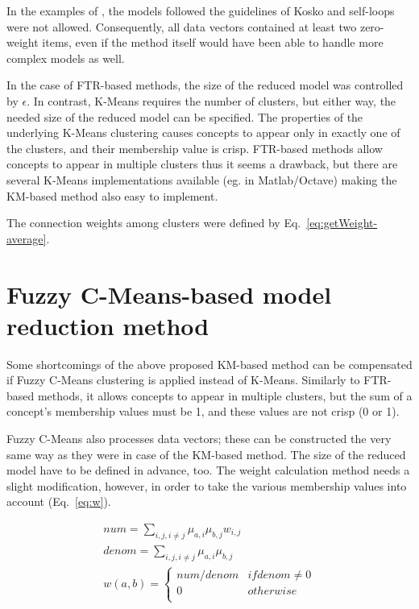 \documentclass[graybox]{svmult}
\begin{document}
In the examples of \cite{hatwagnernovel}, the models followed the 
guidelines of Kosko and self-loops were not allowed. Consequently, all 
data vectors contained at least two zero-weight items, even if the method 
itself would have been able to handle more complex models as well.

In the case of FTR-based methods, the size of the reduced model was 
controlled by $\epsilon$. In contrast, K-Means requires the number of 
clusters, but either way, the needed size of the reduced model can be 
specified. The properties of the underlying K-Means clustering causes 
concepts to appear only in exactly one of the clusters, and their 
membership value is crisp. FTR-based methods allow concepts to appear 
in multiple clusters thus it seems a drawback, but there are several 
K-Means implementations available (eg. in Matlab/Octave) making the 
KM-based method also easy to implement.

The connection weights among clusters were defined by Eq.~\ref{eq:getWeight-average}.

\section{Fuzzy C-Means-based model reduction method}

Some shortcomings of the above proposed KM-based method can be 
compensated if Fuzzy C-Means clustering \cite{yen1999fuzzy} is applied instead of K-Means.
Similarly to FTR-based methods, it allows concepts to appear in 
multiple clusters, but the sum of a concept's membership values must be 
1, and these values are not crisp (0 or 1).

Fuzzy C-Means also processes data vectors; these can be constructed 
the very same way as they were in case of the KM-based method. The size 
of the reduced model have to be defined in advance, too. The weight 
calculation method needs a slight modification, however, in order to 
take the various membership values into account (Eq.~\ref{eq:w}).

\begin{eqnarray}
  \label{eq:num} num = \sum_{i,j,i \ne j}\mu_{a,i}\mu_{b,j}w_{i,j} \\
  \label{eq:denom} denom = \sum_{i,j,i \ne j}\mu_{a,i}\mu_{b,j} \\
  \label{eq:w} w(a,b) = \left \{ 
    \begin{array}{ll}
      num/denom & if denom \ne 0 \\
      0         & otherwise \\
    \end{array}
  \right.
\end{eqnarray}
\end{document}
